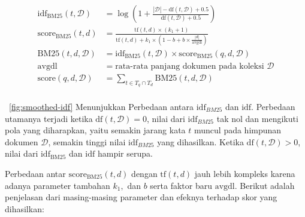     \begin{align}
        \label{eq:smoothed-idf}
        \text{idf}_{\text{BM25}}(t, \mathcal{D}) &= \log\left(1+\frac{|\mathcal{D}| - \text{df}(t, \mathcal{D}) + 0.5}{\text{df}(t, \mathcal{D}) + 0.5}\right) \\
        \label{eq:bm25scoring}
        \text{score}_{\text{BM25}}(t,d) &= \frac{\text{tf}(t, d) \times (k_1 + 1)}{\text{tf}(t, d) + k_1 \times (1 - b + b \times \frac{|d|}{\text{avgdl}})} \\
        \label{eq:bm25-weight}
        \text{BM25}(t, d, \mathcal{D}) &= \text{idf}_{\text{BM25}}(t, \mathcal{D}) \times \text{score}_{\text{BM25}}(q,d,\mathcal{D}) \\
        \text{avgdl} &= \text{rata-rata panjang dokumen pada koleksi } \mathcal{D} \\
        \label{eq:bm25-end}
        \text{score}(q,d,\mathcal{D}) &= \sum_{t \in T_q \cap T_d} \text{BM25}(t, d, \mathcal{D}) \\
    \end{align}

    
    \pic~\ref{fig:smoothed-idf} Menunjukkan Perbedaan antara $\text{idf}_{BM25}$ dan $\text{idf}$. Perbedaan utamanya terjadi ketika $\text{df}(t,\mathcal{D}) = 0$, nilai dari  $\text{idf}_{BM25}$ tak nol dan mengikuti pola yang diharapkan, yaitu semakin jarang kata $t$ muncul pada himpunan dokumen $\mathcal{D}$, semakin tinggi nilai $\text{idf}_{BM25}$ yang dihasilkan. Ketika $\text{df}(t,\mathcal{D})>0$, nilai dari $\text{idf}_{\text{BM25}}$ dan $\text{idf}$ hampir serupa.

    Perbedaan antar $\text{score}_{\text{BM25}}(t,d)$ dengan $\text{tf}(t, d)$ jauh lebih kompleks karena adanya parameter tambahan $k_1,$ dan $b$ serta faktor baru $\text{avgdl}$. Berikut adalah penjelasan dari masing-masing parameter dan efeknya terhadap skor yang dihasilkan:


